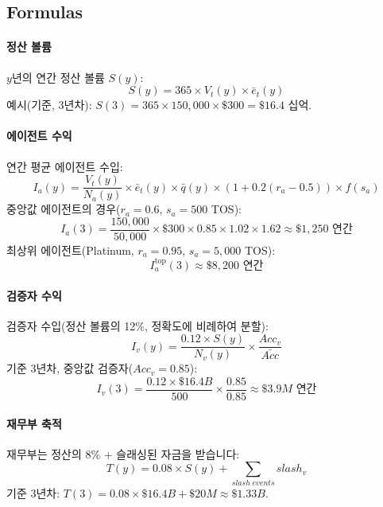 \documentclass[11pt]{article}
\begin{document}
\subsection{Formulas}
\paragraph{정산 볼륨} $y$년의 연간 정산 볼륨 $S(y)$:
\begin{equation}
S(y) = 365 \times V_t(y) \times \bar{e}_t(y)
\end{equation}
예시(기준, 3년차): $S(3) = 365 \times 150{,}000 \times \$300 = \$16.4$ 십억.

\paragraph{에이전트 수익} 연간 평균 에이전트 수입:
\begin{equation}
I_a(y) = \frac{V_t(y)}{N_a(y)} \times \bar{e}_t(y) \times \bar{q}(y) \times (1 + 0.2(r_a - 0.5)) \times f(s_a)
\end{equation}
중앙값 에이전트의 경우($r_a = 0.6$, $s_a = 500$ TOS):
\begin{equation}
I_a(3) = \frac{150{,}000}{50{,}000} \times \$300 \times 0.85 \times 1.02 \times 1.62 \approx \$1{,}250 \text{ 연간}
\end{equation}
최상위 에이전트(Platinum, $r_a = 0.95$, $s_a = 5{,}000$ TOS):
\begin{equation}
I_a^{\text{top}}(3) \approx \$8{,}200 \text{ 연간}
\end{equation}

\paragraph{검증자 수익} 검증자 수입(정산 볼륨의 12\%, 정확도에 비례하여 분할):
\begin{equation}
I_v(y) = \frac{0.12 \times S(y)}{N_v(y)} \times \frac{Acc_v}{\bar{Acc}}
\end{equation}
기준 3년차, 중앙값 검증자($Acc_v = 0.85$):
\begin{equation}
I_v(3) = \frac{0.12 \times \$16.4B}{500} \times \frac{0.85}{0.85} \approx \$3.9M \text{ 연간}
\end{equation}

\paragraph{재무부 축적} 재무부는 정산의 8\% + 슬래싱된 자금을 받습니다:
\begin{equation}
T(y) = 0.08 \times S(y) + \sum_{slash \; events} slash_v
\end{equation}
기준 3년차: $T(3) = 0.08 \times \$16.4B + \$20M \approx \$1.33B$.
\end{document}
